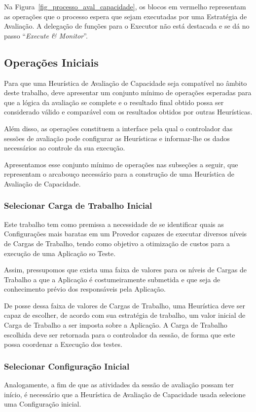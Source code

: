 Na Figura~\ref{fig_processo_aval_capacidade}, os blocos em vermelho representam
as operações que o processo espera que sejam executadas por uma Estratégia de 
Avaliação. A delegação de funções para o Executor não está destacada e se dá no
passo ``\emph{Execute \& Monitor}''.

\subsection{Operações Iniciais}
Para que uma Heurística de Avaliação de Capacidade seja compatível no âmbito deste trabalho, 
deve apresentar um conjunto mínimo de operações esperadas para que a lógica da
avaliação se complete e o resultado final obtido possa ser considerado válido e
comparável com os resultados obtidos por outras Heurísticas.

Além disso, as operações constituem a interface pela qual o controlador das 
sessões de avaliação pode configurar as Heurísticas e informar-lhe os dados 
necessários ao controle da sua execução.
 
Apresentamos esse conjunto mínimo de operações nas subseções a seguir, que 
representam o arcabouço necessário para a construção de uma Heurística de 
Avaliação de Capacidade.

\subsubsection{Selecionar Carga de Trabalho Inicial}
Este trabalho tem como premissa a necessidade de se identificar quais as 
Configurações mais baratas em um Provedor capazes de executar diversos níveis de
Cargas de Trabalho, tendo como objetivo a otimização de custos para a execução de
uma Aplicação so Teste.

Assim, pressupomos que exista uma faixa de valores para os níveis de Cargas de 
Trabalho a que a Aplicação é costumeiramente submetida e que seja de conhecimento
prévio dos responsáveis pela Aplicação. 

De posse dessa faixa de valores de Cargas de Trabalho, uma Heurística deve ser 
capaz de escolher, de acordo com sua estratégia de trabalho, um valor inicial de
Carga de Trabalho a ser imposta sobre a Aplicação. A Carga de Trabalho escolhida
deve ser retornada para o controlador da sessão, de forma que este possa coordenar
a Execução dos testes.
 
\subsubsection{Selecionar Configuração Inicial}
Analogamente, a fim de que as atividades da sessão de avaliação possam ter início,
é necessário que a Heurística de Avaliação de Capacidade usada selecione uma
Configuração inicial.

